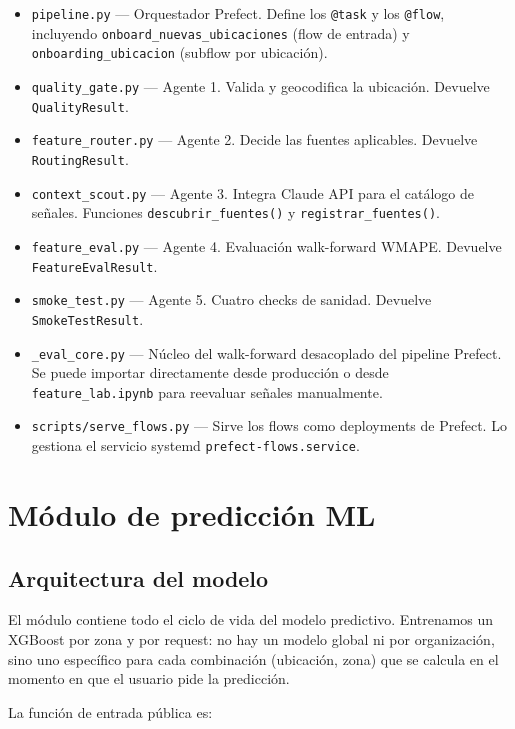 \documentclass[12pt, a4paper]{article}
\begin{document}
\begin{itemize}
  \item \texttt{pipeline.py} — Orquestador Prefect. Define los \texttt{@task} y los \texttt{@flow}, incluyendo \texttt{onboard\_nuevas\_ubicaciones} (flow de entrada) y \texttt{onboarding\_ubicacion} (subflow por ubicación).
  \item \texttt{quality\_gate.py} — Agente 1. Valida y geocodifica la ubicación. Devuelve \texttt{QualityResult}.
  \item \texttt{feature\_router.py} — Agente 2. Decide las fuentes aplicables. Devuelve \texttt{RoutingResult}.
  \item \texttt{context\_scout.py} — Agente 3. Integra Claude API para el catálogo de señales. Funciones \texttt{descubrir\_fuentes()} y \texttt{registrar\_fuentes()}.
  \item \texttt{feature\_eval.py} — Agente 4. Evaluación walk-forward WMAPE. Devuelve \texttt{FeatureEvalResult}.
  \item \texttt{smoke\_test.py} — Agente 5. Cuatro checks de sanidad. Devuelve \texttt{SmokeTestResult}.
  \item \texttt{\_eval\_core.py} — Núcleo del walk-forward desacoplado del pipeline Prefect. Se puede importar directamente desde producción o desde \texttt{feature\_lab.ipynb} para reevaluar señales manualmente.
  \item \texttt{scripts/serve\_flows.py} — Sirve los flows como deployments de Prefect. Lo gestiona el servicio systemd \texttt{prefect-flows.service}.
\end{itemize}

\section{Módulo de predicción ML}

\subsection{Arquitectura del modelo}

El módulo  contiene todo el ciclo de vida del modelo predictivo. Entrenamos un XGBoost por zona y por request: no hay un modelo global ni por organización, sino uno específico para cada combinación (ubicación, zona) que se calcula en el momento en que el usuario pide la predicción.

La función de entrada pública es:
\end{document}
